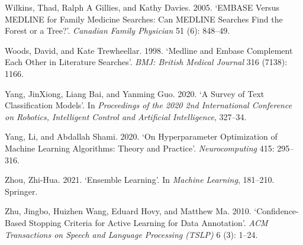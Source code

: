 \documentclass{article}
\newlength{\cslhangindent}
\newenvironment{CSLReferences}[2] %
 {%
  \setlength{\parindent}{0pt}
  \ifodd #1 \everypar{\setlength{\hangindent}{\cslhangindent}}\ignorespaces\fi
  \ifnum #2 > 0
  \setlength{\parskip}{#2\baselineskip}
  \fi
 }%
 {}
\begin{document}
\begin{CSLReferences}{1}{0}
\leavevmode{}%
Wilkins, Thad, Ralph A Gillies, and Kathy Davies. 2005. {`EMBASE Versus
MEDLINE for Family Medicine Searches: Can MEDLINE Searches Find the
Forest or a Tree?'}. \emph{Canadian Family Physician} 51 (6): 848--49.

\leavevmode{}%
Woods, David, and Kate Trewheellar. 1998. {`Medline and Embase
Complement Each Other in Literature Searches'}. \emph{BMJ: British
Medical Journal} 316 (7138): 1166.

\leavevmode{}%
Yang, JinXiong, Liang Bai, and Yanming Guo. 2020. {`A Survey of Text
Classification Models'}. In \emph{Proceedings of the 2020 2nd
International Conference on Robotics, Intelligent Control and Artificial
Intelligence}, 327--34.

\leavevmode{}%
Yang, Li, and Abdallah Shami. 2020. {`On Hyperparameter Optimization of
Machine Learning Algorithms: Theory and Practice'}.
\emph{Neurocomputing} 415: 295--316.

\leavevmode{}%
Zhou, Zhi-Hua. 2021. {`Ensemble Learning'}. In \emph{Machine Learning},
181--210. Springer.

\leavevmode{}%
Zhu, Jingbo, Huizhen Wang, Eduard Hovy, and Matthew Ma. 2010.
{`Confidence-Based Stopping Criteria for Active Learning for Data
Annotation'}. \emph{ACM Transactions on Speech and Language Processing
(TSLP)} 6 (3): 1--24.

\end{CSLReferences}



\end{document}
